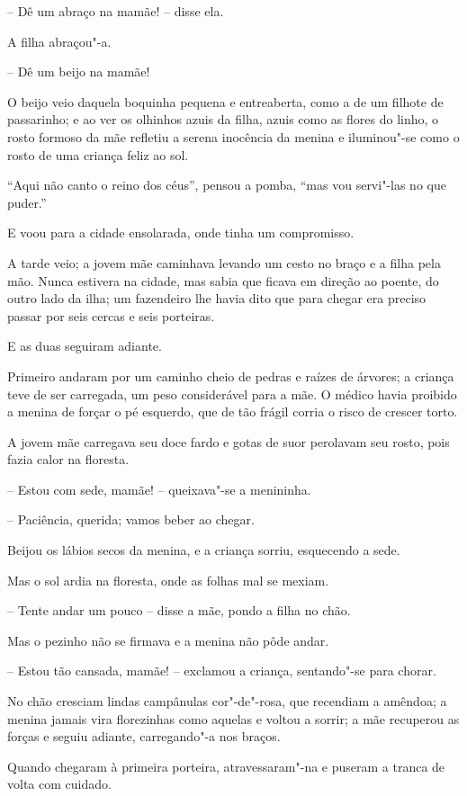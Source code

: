 -- Dê um abraço na mamãe! -- disse ela.

A filha abraçou"-a.

-- Dê um beijo na mamãe!

O beijo veio daquela boquinha pequena e entreaberta, como a de um
filhote de passarinho; e ao ver os olhinhos azuis da filha, azuis como
as flores do linho, o rosto formoso da mãe refletiu a serena inocência
da menina e iluminou"-se como o rosto de uma criança feliz ao sol.

``Aqui não canto o reino dos céus'', pensou a pomba, ``mas vou servi"-las
no que puder.''

E voou para a cidade ensolarada, onde tinha um compromisso.

A tarde veio; a jovem mãe caminhava levando um cesto no braço e a filha
pela mão. Nunca estivera na cidade, mas sabia que ficava em direção ao
poente, do outro lado da ilha; um fazendeiro lhe havia dito que para
chegar era preciso passar por seis cercas e seis porteiras. 

E as duas seguiram adiante.

Primeiro andaram por um caminho cheio de pedras e raízes de árvores; a
criança teve de ser carregada, um peso considerável para a mãe. O
médico havia proibido a menina de forçar o pé esquerdo, que de tão
frágil corria o risco de crescer torto. 

A jovem mãe carregava seu doce fardo e gotas de suor perolavam seu
rosto, pois fazia calor na floresta.

-- Estou com sede, mamãe! -- queixava"-se a menininha.

-- Paciência, querida; vamos beber ao chegar.

Beijou os lábios secos da menina, e a criança sorriu, esquecendo a sede.


Mas o sol ardia na floresta, onde as folhas mal se mexiam. 

-- Tente andar um pouco -- disse a mãe, pondo a filha no chão.

Mas o pezinho não se firmava e a menina não pôde andar. 

-- Estou tão cansada, mamãe! -- exclamou a criança, sentando"-se para
chorar.

No chão cresciam lindas campânulas cor"-de"-rosa, que recendiam a
amêndoa; a menina jamais vira florezinhas como aquelas e voltou a
sorrir; a mãe recuperou as forças e seguiu adiante, carregando"-a nos
braços. 

Quando chegaram à primeira porteira, atravessaram"-na e puseram a
tranca de volta com cuidado. 

